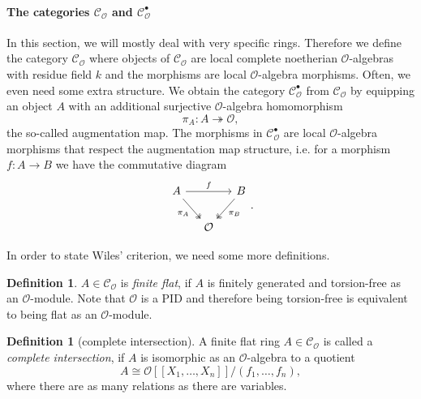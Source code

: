\documentclass{article}
\theoremstyle{plain}%
\theoremstyle{definition}
\newtheorem{definition}[theorem]{Definition}
\theoremstyle{remark}
\newcommand{\cob}{\mathcal{C}_\mathcal{O}^\bullet}
\newcommand{\co}{\mathcal{C}_\mathcal{O}}
\begin{document}
\paragraph{The categories \(\co\) and \(\cob\)}
In this section, we will mostly deal with very specific rings. 
Therefore we define the category \(\co\) where objects of \(\co\) are local complete noetherian \(\mathcal O\)-algebras 
with residue field \(k\) and the morphisms are local \(\mathcal{O}\)-algebra morphisms.
Often, we even need some extra structure. 
We obtain the category \(\cob\) from \(\co\) by equipping an object \(A\) 
with an additional surjective \(\mathcal{O}\)-algebra homomorphism
\[\pi_A \colon A \twoheadrightarrow \mathcal{O},\]
the so-called augmentation map. The morphisms in \(\cob\) are local \(\mathcal{O}\)-algebra morphisms 
that respect the augmentation map structure, 
i.e. for a morphism \(f \colon A \to B\) we have the commutative diagram
\[
\begin{tikzcd}[column sep=small]
    A \arrow[rr, "f"] \arrow [dr, "\pi_A", swap, twoheadrightarrow] & & B \arrow [dl, "\pi_B", twoheadrightarrow]\\
    & \mathcal{O} &
\end{tikzcd}.
\]

In order to state Wiles' criterion, we need some more definitions.
\begin{definition}
    \(A \in \co\) is \textit{finite flat}, if \(A\) is finitely generated 
    and torsion-free as an \(\mathcal{O}\)-module.
    Note that \(\mathcal{O}\) is a PID and therefore being torsion-free 
    is equivalent to being flat as an \(\mathcal{O}\)-module.
\end{definition}

\begin{definition}[complete intersection]\cite[see][Def. 5.1]{Darmon1995}
    A finite flat ring \(A \in \co\) is called a \textit{complete intersection}, 
    if \(A\) is isomorphic as an \(\mathcal{O}\)-algebra to a quotient
    \[A \cong \mathcal{O}[[X_1, \dots, X_n]]/(f_1, \dots, f_n),\] 
    where there are as many relations as there are variables.
\end{definition}
\end{document}
